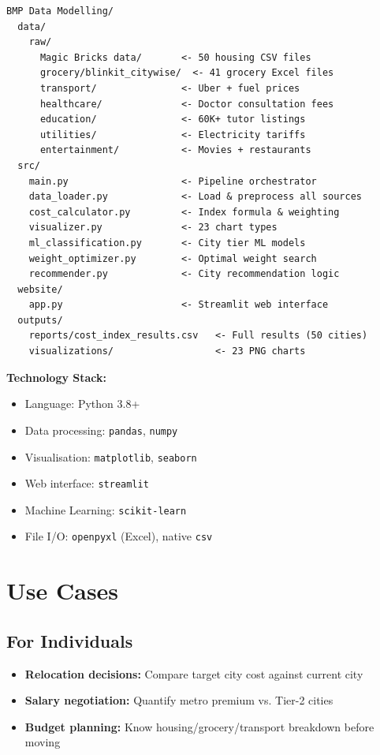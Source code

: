 \documentclass[12pt,a4paper]{article}
\begin{document}
\begin{lstlisting}
BMP Data Modelling/
  data/
    raw/
      Magic Bricks data/       <- 50 housing CSV files
      grocery/blinkit_citywise/  <- 41 grocery Excel files
      transport/               <- Uber + fuel prices
      healthcare/              <- Doctor consultation fees
      education/               <- 60K+ tutor listings
      utilities/               <- Electricity tariffs
      entertainment/           <- Movies + restaurants
  src/
    main.py                    <- Pipeline orchestrator
    data_loader.py             <- Load & preprocess all sources
    cost_calculator.py         <- Index formula & weighting
    visualizer.py              <- 23 chart types
    ml_classification.py       <- City tier ML models
    weight_optimizer.py        <- Optimal weight search
    recommender.py             <- City recommendation logic
  website/
    app.py                     <- Streamlit web interface
  outputs/
    reports/cost_index_results.csv   <- Full results (50 cities)
    visualizations/                  <- 23 PNG charts
\end{lstlisting}

\textbf{Technology Stack:}

\begin{itemize}
  \item Language: Python 3.8+
  \item Data processing: \texttt{pandas}, \texttt{numpy}
  \item Visualisation: \texttt{matplotlib}, \texttt{seaborn}
  \item Web interface: \texttt{streamlit}
  \item Machine Learning: \texttt{scikit-learn}
  \item File I/O: \texttt{openpyxl} (Excel), native \texttt{csv}
\end{itemize}

\section{Use Cases}

\subsection{For Individuals}
\begin{itemize}
  \item \textbf{Relocation decisions:} Compare target city cost against current city
  \item \textbf{Salary negotiation:} Quantify metro premium vs. Tier-2 cities
  \item \textbf{Budget planning:} Know housing/grocery/transport breakdown before moving
\end{itemize}
\end{document}
